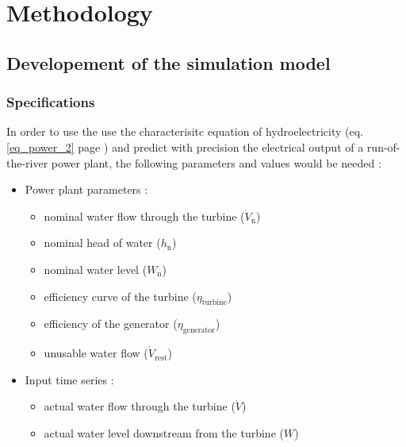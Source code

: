 \chapter{Methodology}
\label{chap:methodology}

\section{Developement of the simulation model}

\subsection{Specifications}
In order to use the use the characterisitc equation of hydroelectricity (eq. \ref{eq_power_2} page \pageref{eq_power_2}) and predict with precision the electrical output of a run-of-the-river power plant, the following parameters and values would be needed : 
\begin{itemize}
\itemsep0em
 \item Power plant parameters : 
 \begin{itemize}
  \item nominal water flow through the turbine ($\dot{V}_\mathrm{n}$)
  \item nominal head of water ($h_\mathrm{n}$)
  \item nominal water level ($W_\mathrm{n}$)
  \item efficiency curve of the turbine ($\eta_\mathrm{turbine}$) 
  \item efficiency of the generator ($\eta_\mathrm{generator}$)  
  \item unusable water flow ($\dot{V}_\mathrm{rest}$)  
 \end{itemize}
 \item Input time series : 
 \begin{itemize}
  \item actual water flow through the turbine ($\dot{V}$)
  \item actual water level downstream from the turbine ($W$)
 \end{itemize}
\end{itemize}


